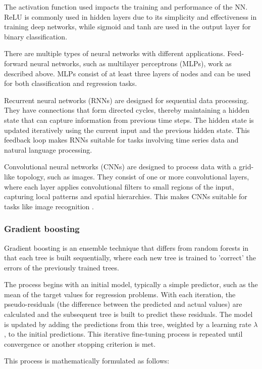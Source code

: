 The activation function used impacts the training and performance of the NN. ReLU is commonly used in hidden layers due to its simplicity and effectiveness in training deep networks, while sigmoid and tanh are used in the output layer for binary classification.

There are multiple types of neural networks with different applications. Feed-forward neural networks, such as multilayer perceptrons (MLPs), work as described above. MLPs consist of at least three layers of nodes and can be used for both classification and regression tasks. 

Recurrent neural networks (RNNs) are designed for sequential data processing. They have connections that form directed cycles, thereby maintaining a hidden state that can capture information from previous time steps. The hidden state is updated iteratively using the current input and the previous hidden state. This feedback loop makes RNNs suitable for tasks involving time series data and natural language processing.

Convolutional neural networks (CNNs) are designed to process data with a grid-like topology, such as images. They consist of one or more convolutional layers, where each layer applies convolutional filters to small regions of the input, capturing local patterns and spatial hierarchies. This makes CNNs suitable for tasks like image recognition \cite{cnn-paper}.

\subsubsection{Gradient boosting}

Gradient boosting \cite{friedmanboosting} is an ensemble technique that differs from random forests in that each tree is built sequentially, where each new tree is trained to 'correct' the errors of the previously trained trees. 

The process begins with an initial model, typically a simple predictor, such as the mean of the target values for regression problems. With each iteration, the pseudo-residuals (the difference between the predicted and actual values) are calculated and the subsequent tree is built to predict these residuals. The model is updated by adding the predictions from this tree, weighted by a learning rate $\lambda$, to the initial predictions. This iterative fine-tuning process is repeated until convergence or another stopping criterion is met. 

This process is mathematically formulated as follows:

